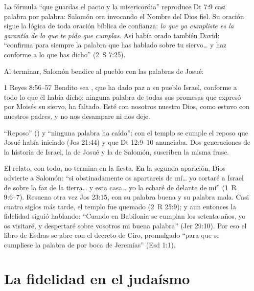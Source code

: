 La fórmula ``que guardas el pacto y la misericordia'' reproduce Dt 7:9 casi palabra por palabra: Salomón ora invocando el Nombre del Dios fiel. Su oración sigue la lógica de toda oración bíblica de confianza: \emph{lo que ya cumpliste es la garantía de lo que te pido que cumplas}. Así había orado también David: ``confirma para siempre la palabra que has hablado sobre tu siervo\ldots{} y haz conforme a lo que has dicho'' (2~S 7:25).

Al terminar, Salomón bendice al pueblo con las palabras de Josué:

\begin{verso}{1 Reyes 8:56–57}
Bendito sea \SENOR, que ha dado paz a su pueblo Israel, conforme a todo lo que él había dicho; ninguna palabra de todas sus promesas que expresó por Moisés su siervo, ha faltado. Esté con nosotros \SENOR{} nuestro Dios, como estuvo con nuestros padres, y no nos desampare ni nos deje.
\end{verso}

``Reposo'' () y ``ninguna palabra ha caído'': con el templo se cumple el reposo que Josué había iniciado (Jos 21:44) y que Dt 12:9--10 anunciaba. Dos generaciones de la historia de Israel, la de Josué y la de Salomón, suscriben la misma frase.

El relato, con todo, no termina en la fiesta. En la segunda aparición, Dios advierte a Salomón: ``si obstinadamente os apartareis de mí\ldots{} yo cortaré a Israel de sobre la faz de la tierra\ldots{} y esta casa\ldots{} yo la echaré de delante de mí'' (1~R 9:6--7). Resuena otra vez Jos 23:15, con su palabra buena y su palabra mala. Casi cuatro siglos más tarde, el templo fue quemado (2~R 25:9); y aun entonces la fidelidad siguió hablando: ``Cuando en Babilonia se cumplan los setenta años, yo os visitaré, y despertaré sobre vosotros mi buena palabra'' (Jer 29:10). Por eso el libro de Esdras se abre con el decreto de Ciro, promulgado ``para que se cumpliese la palabra de \SENOR{} por boca de Jeremías'' (Esd 1:1).


\section{La fidelidad en el judaísmo}


